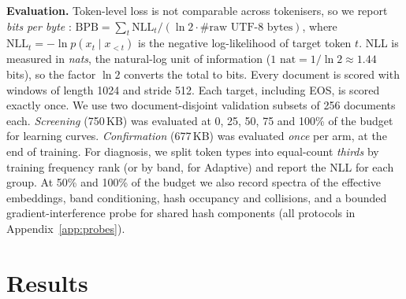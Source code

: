 \documentclass[10pt,a4paper]{article}
\newcommand{\bpb}{\text{BPB}}
\begin{document}
\textbf{Evaluation.} Token-level loss is not comparable across tokenisers, so we report \emph{bits per
byte} \citep{gao2020pile}: $\bpb=\sum_t \mathrm{NLL}_t / (\ln 2\cdot\#\text{raw UTF-8 bytes})$, where
$\mathrm{NLL}_t=-\ln p(x_t\mid x_{<t})$ is the negative log-likelihood of target token $t$. NLL is
measured in \emph{nats}, the natural-log unit of information ($1\text{ nat}=1/\ln 2\approx1.44$ bits),
so the factor $\ln 2$ converts the total to bits. Every document is scored with windows of length 1024
and stride 512. Each target, including EOS, is scored exactly
once. We use two document-disjoint validation subsets of 256 documents each. \emph{Screening} (750\,KB)
was evaluated at 0, 25, 50, 75 and 100\% of the budget for learning curves. \emph{Confirmation} (677\,KB)
was evaluated \emph{once} per arm, at the end of training. For diagnosis, we split token types into equal-count
\emph{thirds} by training frequency rank (or by band, for Adaptive) and report the NLL for each group. At
50\% and 100\% of the budget we also record spectra of the effective embeddings, band conditioning, hash
occupancy and collisions, and a bounded gradient-interference probe for shared hash components (all
protocols in Appendix~\ref{app:probes}).

\section{Results}
\label{sec:results}
\end{document}
